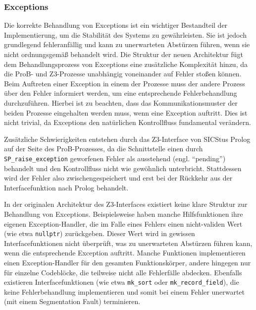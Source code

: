 \subsubsection{Exceptions}
\label{subsec:exceptions}

Die korrekte Behandlung von Exceptions ist ein wichtiger Bestandteil der Implementierung, um die Stabilität des Systems zu gewährleisten.
Sie ist jedoch grundlegend fehleranfällig und kann zu unerwarteten Abstürzen führen, wenn sie nicht ordnungsgemäß behandelt wird.
Die Struktur der neuen Architektur fügt dem Behandlungsprozess von Exceptions eine zusätzliche Komplexität hinzu, da die ProB- und Z3-Prozesse unabhängig voneinander auf Fehler stoßen können.
Beim Auftreten einer Exception in einem der Prozesse muss der andere Prozess über den Fehler informiert werden, um eine entsprechende Fehlerbehandlung durchzuführen.
Hierbei ist zu beachten, dass das Kommunikationsmuster der beiden Prozesse eingehalten werden muss, wenn eine Exception auftritt.
Dies ist nicht trivial, da Exceptions den natürlichen Kontrollfluss fundamental verändern.

Zusätzliche Schwierigkeiten entstehen durch das Z3-Interface von SICStus Prolog auf der Seite des ProB-Prozesses,
da die Schnittstelle einen durch \texttt{SP\_raise\_exception} geworfenen Fehler als ausstehend (engl. \enquote{pending}) behandelt und den Kontrollfluss nicht wie gewöhnlich unterbricht.
Stattdessen wird der Fehler also zwischengespeichert und erst bei der Rückkehr aus der Interfacefunktion nach Prolog behandelt.

In der originalen Architektur des Z3-Interfaces existiert keine klare Struktur zur Behandlung von Exceptions.
Beispielsweise haben manche Hilfsfunktionen ihre eigenen Exception-Handler, die im Falle eines Fehlers einen nicht-validen Wert (wie etwa \texttt{nullptr}) zurückgeben.
Dieser Wert wird in gewissen Interfacefunktionen nicht überprüft, was zu unerwarteten Abstürzen führen kann, wenn die entsprechende Exception auftritt.
Manche Funktionen implementieren einen Exception-Handler für den gesamten Funktionskörper, andere hingegen nur für einzelne Codeblöcke, die teilweise nicht alle Fehlerfälle abdecken.
Ebenfalls existieren Interfacefunktionen (wie etwa \texttt{mk\_sort} oder \texttt{mk\_record\_field}), die keine Fehlerbehandlung implementieren und somit bei einem Fehler unerwartet (mit einem Segmentation Fault) terminieren.

